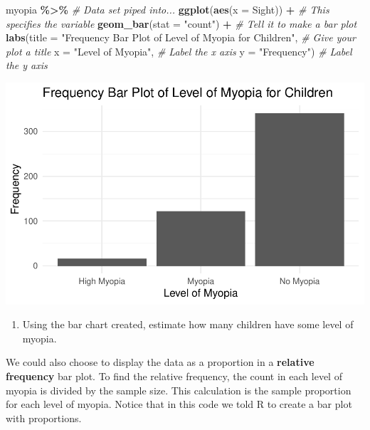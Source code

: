 \documentclass[
]{report}
\newenvironment{Shaded}{\begin{snugshade}}{\end{snugshade}}
\newcommand{\AttributeTok}[1]{\textcolor[rgb]{0.13,0.29,0.53}{#1}}
\newcommand{\CommentTok}[1]{\textcolor[rgb]{0.56,0.35,0.01}{\textit{#1}}}
\newcommand{\FunctionTok}[1]{\textcolor[rgb]{0.13,0.29,0.53}{\textbf{#1}}}
\newcommand{\NormalTok}[1]{#1}
\newcommand{\SpecialCharTok}[1]{\textcolor[rgb]{0.81,0.36,0.00}{\textbf{#1}}}
\newcommand{\StringTok}[1]{\textcolor[rgb]{0.31,0.60,0.02}{#1}}
\providecommand{\tightlist}{%
  \setlength{\itemsep}{0pt}\setlength{\parskip}{0pt}}
\begin{document}
\begin{Shaded}
\begin{Highlighting}[]
\NormalTok{myopia }\SpecialCharTok{\%\textgreater{}\%} \CommentTok{\# Data set piped into...}
\FunctionTok{ggplot}\NormalTok{(}\FunctionTok{aes}\NormalTok{(}\AttributeTok{x =}\NormalTok{ Sight)) }\SpecialCharTok{+}   \CommentTok{\# This specifies the variable}
  \FunctionTok{geom\_bar}\NormalTok{(}\AttributeTok{stat =} \StringTok{"count"}\NormalTok{) }\SpecialCharTok{+}  \CommentTok{\# Tell it to make a bar plot}
  \FunctionTok{labs}\NormalTok{(}\AttributeTok{title =} \StringTok{"Frequency Bar Plot of Level of Myopia for Children"}\NormalTok{,  }
       \CommentTok{\# Give your plot a title}
       \AttributeTok{x =} \StringTok{"Level of Myopia"}\NormalTok{,   }\CommentTok{\# Label the x axis}
       \AttributeTok{y =} \StringTok{"Frequency"}\NormalTok{)  }\CommentTok{\# Label the y axis}
\end{Highlighting}
\end{Shaded}

\begin{center}\includegraphics[width=0.5\linewidth]{03-OCA02-EDA_files/figure-latex/unnamed-chunk-3-1} \end{center}

\begin{enumerate}
\def\labelenumi{\arabic{enumi}.}
\setcounter{enumi}{1}
\tightlist
\item
  Using the bar chart created, estimate how many children have some level of myopia.
\end{enumerate}

\vspace{0.2in}

We could also choose to display the data as a proportion in a \textbf{relative frequency} bar plot. To find the relative frequency, the count in each level of myopia is divided by the sample size. This calculation is the sample proportion for each level of myopia. Notice that in this code we told R to create a bar plot with proportions.
\end{document}
